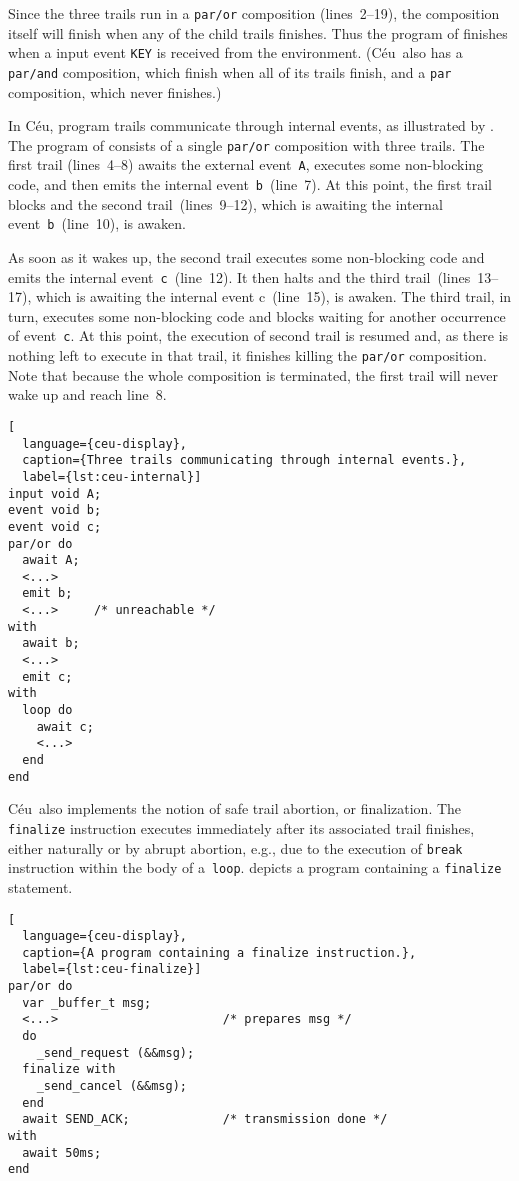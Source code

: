 \documentclass[10pt,a4paper,oneside,leqno]{article}
\numberwithin{equation}{section}
\def\Ceu{C\'eu}
\def\ceulst#1{\lstinline[language=ceu,basicstyle=\ttfamily]|#1|}
\begin{document}
Since the three trails run in a \ceulst{par/or} composition (lines~2--19),
the composition itself will finish when any of the child trails finishes.
Thus the program of  finishes when a input event
\ceulst{KEY} is received from the environment.  (\Ceu\ also has a
\ceulst{par/and} composition, which finish when all of its trails finish,
and a \ceulst{par} composition, which never finishes.)

In \Ceu, program trails communicate through internal events, as illustrated
by .  The program of  consists
of a single \ceulst{par/or} composition with three trails.  The first trail
(lines~4--8) awaits the external event~\ceulst{A}, executes some
non-blocking code, and then emits the internal event~\ceulst{b}~(line~7).
At this point, the first trail blocks and the second trail~(lines~9--12),
which is awaiting the internal event~\ceulst{b}~(line~10), is awaken.

As soon as it wakes up, the second trail executes some non-blocking code and
emits the internal event~\ceulst{c}~(line~12).  It then halts and the third
trail~(lines~13--17), which is awaiting the internal event c~(line~15), is
awaken.  The third trail, in turn, executes some non-blocking code and
blocks waiting for another occurrence of event~\ceulst{c}.  At this point,
the execution of second trail is resumed and, as there is nothing left to
execute in that trail, it finishes killing the \ceulst{par/or} composition.
Note that because the whole composition is terminated, the first trail will
never wake up and reach line~8.

\begin{lstlisting}[
  language={ceu-display},
  caption={Three trails communicating through internal events.},
  label={lst:ceu-internal}]
input void A;
event void b;
event void c;
par/or do
  await A;
  <...>
  emit b;
  <...>     /* unreachable */
with
  await b;
  <...>
  emit c;
with
  loop do
    await c;
    <...>
  end
end
\end{lstlisting}

\Ceu\ also implements the notion of safe trail abortion, or finalization.
The \ceulst{finalize} instruction executes immediately after its associated
trail finishes, either naturally or by abrupt abortion, e.g., due to the
execution of \ceulst{break} instruction within the body of a~\ceulst{loop}.
 depicts a program containing a \ceulst{finalize}
statement.

\begin{lstlisting}[
  language={ceu-display},
  caption={A program containing a finalize instruction.},
  label={lst:ceu-finalize}]
par/or do
  var _buffer_t msg;
  <...>                       /* prepares msg */
  do
    _send_request (&&msg);
  finalize with
    _send_cancel (&&msg);
  end
  await SEND_ACK;             /* transmission done */
with
  await 50ms;
end
\end{lstlisting}
\end{document}
